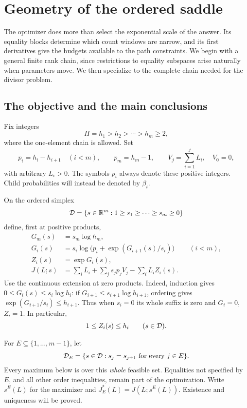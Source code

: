 \section{Geometry of the ordered saddle}\label{sec:geometry}\label{paper:geometry}

The optimizer does more than select the exponential scale of the answer.
Its equality blocks determine which count windows are narrow, and its
first derivatives give the budgets available to the path constraints.
We begin with a general finite rank chain, since restrictions to equality
subspaces arise naturally when parameters move. We then specialize to the
complete chain needed for the divisor problem.

\subsection{The objective and the main conclusions}

Fix integers
\[
 H=h_1>h_2>\cdots>h_m\ge 2,
\]
where the one-element chain is allowed.  Set
\[
 p_i=h_i-h_{i+1}\quad(i<m),\qquad p_m=h_m-1,
 \qquad V_j=\sum_{i=1}^j L_i,\quad V_0=0,
\]
with arbitrary \(L_i>0\).  The symbols \(p_i\) always denote these
positive integers.  Child probabilities will instead be denoted by
\(\beta_i\).

On the ordered simplex
\[
 \mathcal D=\{s\in\mathbb R^m:1\ge s_1\ge\cdots\ge s_m\ge0\}
\]
define, first at positive products,
\begin{align}
 G_m(s)&=s_m\log h_m,\nonumber\\
 G_i(s)&=s_i\log\bigl(p_i+\exp(G_{i+1}(s)/s_i)\bigr)
                   &&(i<m),\label{geom:eq:recursion}\\
 Z_i(s)&=\exp G_i(s),\nonumber\\
 J(L;s)&=\sum_iL_i+\sum_j s_jp_jV_j-\sum_iL_iZ_i(s).
                                                        \label{geom:eq:objective}
\end{align}
Use the continuous extension at zero products.  Indeed, induction gives
\(0\le G_i(s)\le s_i\log h_i\): if
\(G_{i+1}\le s_{i+1}\log h_{i+1}\), ordering gives
\(\exp(G_{i+1}/s_i)\le h_{i+1}\).  Thus when \(s_i=0\) its whole
suffix is zero and \(G_i=0\), \(Z_i=1\).  In particular,
\begin{equation}
 1\le Z_i(s)\le h_i \qquad(s\in\mathcal D).             \label{geom:eq:globalZ}
\end{equation}

For \(E\subseteq\{1,\ldots,m-1\}\), let
\[
 \mathcal D_E=\{s\in\mathcal D:s_j=s_{j+1}\text{ for every }j\in E\}.
\]
Every maximum below is over this \emph{whole} feasible set.  Equalities
not specified by \(E\), and all other order inequalities, remain part
of the optimization.  Write \(s^E(L)\) for the maximizer and
\(J_E^*(L)=J(L;s^E(L))\).  Existence and uniqueness will be proved.

